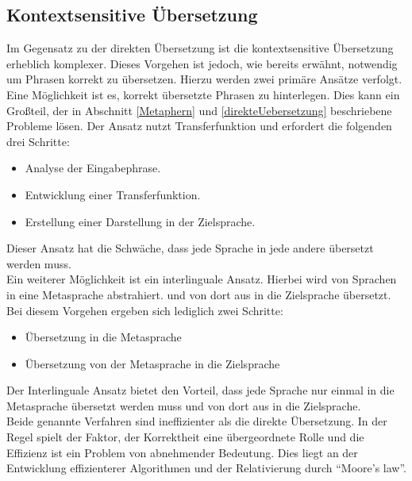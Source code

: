 \documentclass[twoside,a4paper]{article}
\begin{document}
\subsection{Kontextsensitive Übersetzung}
Im Gegensatz zu der direkten Übersetzung ist die kontextsensitive Übersetzung erheblich komplexer. Dieses Vorgehen ist jedoch, wie bereits erwähnt, notwendig um Phrasen korrekt zu übersetzen. Hierzu werden zwei primäre Ansätze verfolgt.\\
Eine Möglichkeit ist es, korrekt übersetzte Phrasen zu hinterlegen. Dies kann ein Großteil, der in Abschnitt \ref{Metaphern} und \ref{direkteUebersetzung} beschriebene Probleme lösen. Der Ansatz nutzt Transferfunktion und erfordert die folgenden drei Schritte:
\begin{itemize}
	\item Analyse der Eingabephrase.
	\item Entwicklung einer Transferfunktion.
	\item Erstellung einer Darstellung in der Zielsprache.
\end{itemize}
Dieser Ansatz hat die Schwäche, dass jede Sprache in jede andere übersetzt werden muss.\\
Ein weiterer Möglichkeit ist ein interlinguale Ansatz. Hierbei wird von Sprachen in eine Metasprache abstrahiert. und von dort aus in die Zielsprache übersetzt. Bei diesem Vorgehen ergeben sich lediglich zwei Schritte:
\begin{itemize}
	\item Übersetzung in die Metasprache
	\item Übersetzung von der Metasprache in die Zielsprache
\end{itemize}
Der Interlinguale Ansatz bietet den Vorteil, dass jede Sprache nur einmal in die Metasprache übersetzt werden muss und von dort aus in die Zielsprache.\\
Beide genannte Verfahren sind ineffizienter als die direkte Übersetzung. In der Regel spielt der Faktor, der Korrektheit eine übergeordnete Rolle und die Effizienz ist ein Problem von abnehmender Bedeutung. Dies liegt an der Entwicklung effizienterer Algorithmen und der Relativierung durch \enquote{Moore's law}\cite{mooreslaw}.
\end{document}
